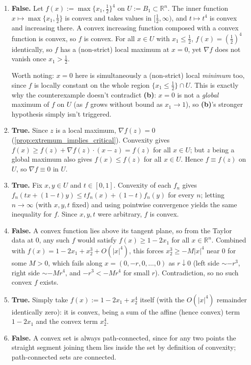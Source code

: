 \begin{exercisesolution}
\begin{enumerate}[label=\textbf{(\alph*)}]
  \item \textbf{False.} Let $f(x) := \max\{x_1, \tfrac12\}^4$ on $U := B_1 \subset \mathbb{R}^n$.
    The inner function $x \mapsto \max\{x_1,\tfrac12\}$ is convex and takes values in
    $[\tfrac12,\infty)$, and $t \mapsto t^4$ is convex and increasing there. A convex
    increasing function composed with a convex function is convex, so $f$ is convex. For all $x \in U$ with $x_1 \leq \tfrac12$,
    $f(x) = (\tfrac12)^4$ identically, so $f$ has a (non-strict) local maximum at $x=0$, yet
    $\nabla f$ does not vanish once $x_1 > \tfrac12$.

    \begin{remark}
    Worth noting: $x=0$ here is simultaneously a (non-strict) local \emph{minimum} too, since $f$
    is locally constant on the whole region $\{x_1 \leq \tfrac12\} \cap U$. This is exactly why
    the counterexample doesn't contradict \textbf{(b)}: $x=0$ is not a \emph{global} maximum of
    $f$ on $U$ (as $f$ grows without bound as $x_1 \to 1$), so \textbf{(b)}'s stronger hypothesis
    simply isn't triggered.
    \end{remark}
  \item \textbf{True.} Since $z$ is a local maximum, $\nabla f(z) = 0$
    (\cref{prop:extremum_implies_critical}). Convexity gives $f(x) \geq f(z) + \nabla f(z)\cdot(x-z)
    = f(z)$ for all $x \in U$; but $z$ being a global maximum also gives $f(x) \leq f(z)$ for all
    $x \in U$. Hence $f \equiv f(z)$ on $U$, so $\nabla f \equiv 0$ in $U$.
  \item \textbf{True.} Fix $x, y \in U$ and $t \in [0,1]$. Convexity of each $f_n$ gives
    $f_n(tx+(1-t)y) \leq tf_n(x) + (1-t)f_n(y)$ for every $n$; letting $n \to \infty$ (with
    $x,y,t$ fixed) and using pointwise convergence yields the same inequality for $f$. Since
    $x,y,t$ were arbitrary, $f$ is convex.
  \item \textbf{False.} A convex function lies above its tangent plane, so from the Taylor data at
    $0$, any such $f$ would satisfy $f(x) \geq 1-2x_1$ for all $x \in \mathbb{R}^n$. Combined with
    $f(x) = 1-2x_1+x_2^3+O(|x|^4)$, this forces $x_2^3 \geq -M|x|^4$ near $0$ for some $M>0$,
    which fails along $x = (0,-r,0,\dots,0)$ as $r \downarrow 0$ (left side $\sim -r^3$, right
    side $\sim -Mr^4$, and $-r^3 < -Mr^4$ for small $r$). Contradiction, so no such convex $f$
    exists.
  \item \textbf{True.} Simply take $f(x) := 1-2x_1+x_2^4$ itself (with the $O(|x|^4)$ remainder
    identically zero): it is convex, being a sum of the affine (hence convex) term $1-2x_1$ and
    the convex term $x_2^4$.
  \item \textbf{False.} A convex set is always path-connected, since for any two points the
    straight segment joining them lies inside the set by definition of convexity; path-connected
    sets are connected.
\end{enumerate}
\end{exercisesolution}

